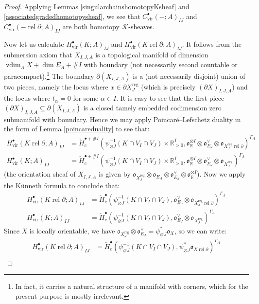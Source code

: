 \documentclass[12pt]{article}
\theoremstyle{definition}
\theoremstyle{remark}
\numberwithin{equation}{subsection}
\newcommand{\K}{\mathcal K}
\newcommand{\oo}{\mathfrak o}
\newcommand{\RR}{\mathbb R}
\newcommand{\cH}{\check H}
\newcommand{\vdim}{\operatorname{vdim}}
\newcommand{\vir}{\mathrm{vir}}
\newcommand{\reg}{\mathrm{reg}}
\newcommand{\rel}{\operatorname{rel}}
\begin{document}
\begin{proof}
Applying Lemmas \ref{singularchainshomotopyKsheaf} and \ref{associatedgradedhomotopysheaf}, we see that $C^\bullet_\vir(-;A)_{IJ}$ and $C^\bullet_\vir(-\rel\partial;A)_{IJ}$ are both homotopy $\K$-sheaves.

Now let us calculate $H^\bullet_\vir(K;A)_{IJ}$ and $H^\bullet_\vir(K\rel\partial;A)_{IJ}$.  It follows from the submersion axiom that $X_{I,J,A}$ is a topological manifold of dimension $\vdim_AX+\dim E_A+\#I$ with boundary (not necessarily second countable or paracompact).\footnote{In fact, it carries a natural structure of a manifold with corners, which for the present purpose is mostly irrelevant.}  The boundary $\partial(X_{I,J,A})$ is a (not necessarily disjoint) union of two pieces, namely the locus where $x\in\partial X_J^\reg$ (which is precisely $(\partial X)_{I,J,A}$) and the locus where $t_\alpha=0$ for some $\alpha\in I$.  It is easy to see that the first piece $(\partial X)_{I,J,A}\subseteq\partial(X_{I,J,A})$ is a closed tamely embedded codimension zero submanifold with boundary.  Hence we may apply Poincar\'e--Lefschetz duality in the form of Lemma \ref{poincareduality} to see that:
\begin{align}
H^\bullet_\vir(K\rel\partial;A)_{IJ}&=\cH_c^{\bullet+\#I}(\psi_{\varnothing J}^{-1}(K\cap V_I\cap V_J)\times\RR_{>0}^I,\oo_\RR^{\otimes I}\otimes\oo_{E_J}^\vee\otimes\oo_{X_J^\reg\rel\partial})^{\Gamma_A}\\
H^\bullet_\vir(K;A)_{IJ}&=\cH_c^{\bullet+\#I}(\psi_{\varnothing J}^{-1}(K\cap V_I\cap V_J)\times\RR_{>0}^I,\oo_\RR^{\otimes I}\otimes\oo_{E_J}^\vee\otimes\oo_{X_J^\reg})^{\Gamma_A}
\end{align}
(the orientation sheaf of $X_{I,J,A}$ is given by $\oo_{X_J^\reg}\otimes\oo_{E_A}\otimes\oo_{E_J}^\vee\otimes\oo_\RR^{\otimes I}$).  Now we apply the K\"unneth formula to conclude that:
\begin{align}
H^\bullet_\vir(K\rel\partial;A)_{IJ}&=\cH^\bullet_c(\psi_{\varnothing J}^{-1}(K\cap V_I\cap V_J),\oo_{E_J}^\vee\otimes\oo_{X_J^\reg\rel\partial})^{\Gamma_A}\\
H^\bullet_\vir(K;A)_{IJ}&=\cH^\bullet_c(\psi_{\varnothing J}^{-1}(K\cap V_I\cap V_J),\oo_{E_J}^\vee\otimes\oo_{X_J^\reg})^{\Gamma_A}
\end{align}
Since $X$ is locally orientable, we have $\oo_{X_J^\reg}\otimes\oo_{E_J}^\vee=\psi_{\varnothing J}^\ast\oo_X$, so we can write:
\begin{align}
H^\bullet_\vir(K\rel\partial;A)_{IJ}&=\cH^\bullet_c(\psi_{\varnothing J}^{-1}(K\cap V_I\cap V_J),\psi_{\varnothing J}^\ast\oo_{X\rel\partial})^{\Gamma_A}\\

\end{align}
\end{proof}
\end{document}
